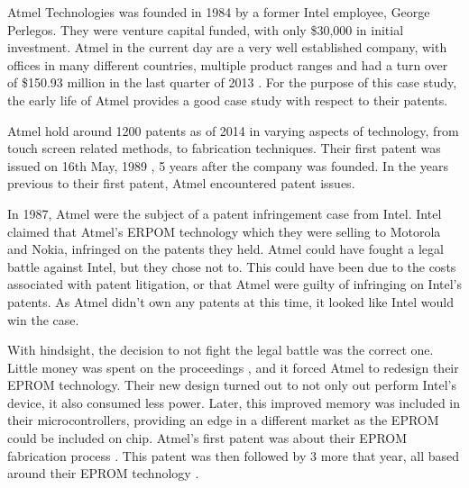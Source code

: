 
{}


Atmel Technologies was founded in 1984 by a former Intel employee, George Perlegos.
They were venture capital funded, with only \$30,000 in initial investment.
Atmel in the current day are a very well established company, with offices in many different countries, multiple product ranges and had a turn over of \$150.93 million in the last quarter of 2013 \cite{atmel:profit}.
For the purpose of this case study, the early life of Atmel provides a good case study with respect to their patents.


Atmel hold around 1200 patents as of 2014 \cite{atmelpatents} in varying aspects of technology, from touch screen related methods, to fabrication techniques.
Their first patent was issued on 16th May, 1989 \cite{atmel:eprompatent}, 5 years after the company was founded.
In the years previous to their first patent, Atmel encountered patent issues.

In 1987, Atmel were the subject of a patent infringement case from Intel.
Intel claimed that Atmel's ERPOM technology which they were selling to Motorola and Nokia, infringed on the patents they held.
Atmel could have fought a legal battle against Intel, but they chose not to. 
This could have been due to the costs associated with patent litigation, or that Atmel were guilty of infringing on Intel's patents.
As Atmel didn't own any patents at this time, it looked like Intel would win the case. 

With hindsight, the decision to not fight the legal battle was the correct one. 
Little money was spent on the proceedings , and it forced Atmel to redesign their EPROM technology.
Their new design turned out to not only out perform Intel's device, it also consumed less power.
Later, this improved memory was included in their microcontrollers, providing an edge in a different market as the EPROM could be included on chip.
Atmel's first patent was about their EPROM fabrication process \cite{atmel:eprompatent}.
This patent was then followed by 3 more that year, all based around their EPROM technology \cite{atmel:eprom1,atmel:eprom2,atmel:eprom3}.

